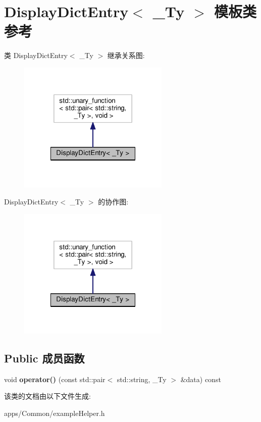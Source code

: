 \hypertarget{class_display_dict_entry}{\section{Display\+Dict\+Entry$<$ \+\_\+\+Ty $>$ 模板类 参考}
\label{class_display_dict_entry}
}


类 Display\+Dict\+Entry$<$ \+\_\+\+Ty $>$ 继承关系图\+:
\nopagebreak
\begin{figure}[H]
\begin{center}
\leavevmode
\includegraphics[width=204pt]{class_display_dict_entry__inherit__graph}
\end{center}
\end{figure}


Display\+Dict\+Entry$<$ \+\_\+\+Ty $>$ 的协作图\+:
\nopagebreak
\begin{figure}[H]
\begin{center}
\leavevmode
\includegraphics[width=204pt]{class_display_dict_entry__coll__graph}
\end{center}
\end{figure}
\subsection*{Public 成员函数}
\begin{DoxyCompactItemize}
\item 
\hypertarget{class_display_dict_entry_ae004ea7bfce6dfd45ddda7b78074ed32}{void {\bfseries operator()} (const std\+::pair$<$ std\+::string, \+\_\+\+Ty $>$ \&data) const }\label{class_display_dict_entry_ae004ea7bfce6dfd45ddda7b78074ed32}

\end{DoxyCompactItemize}


该类的文档由以下文件生成\+:\begin{DoxyCompactItemize}
\item 
apps/\+Common/example\+Helper.\+h\end{DoxyCompactItemize}
